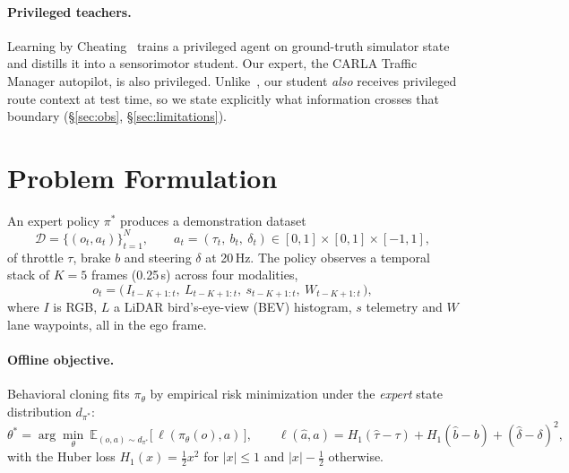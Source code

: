 \documentclass[11pt]{article}
\begin{document}
\paragraph{Privileged teachers.} Learning by Cheating~\cite{chen2019lbc} trains a privileged agent on ground-truth simulator state and distills it into a sensorimotor student. Our expert, the CARLA Traffic Manager autopilot, is also privileged. Unlike~\cite{chen2019lbc}, our student \emph{also} receives privileged route context at test time, so we state explicitly what information crosses that boundary (\S\ref{sec:obs}, \S\ref{sec:limitations}).

\section{Problem Formulation}
\label{sec:problem}

An expert policy $\pi^\ast$ produces a demonstration dataset
\begin{equation}
\mathcal{D} = \{(o_t, a_t)\}_{t=1}^{N}, \qquad a_t = (\tau_t,\ b_t,\ \delta_t) \in [0,1]\times[0,1]\times[-1,1],
\end{equation}
of throttle $\tau$, brake $b$ and steering $\delta$ at 20\,Hz. The policy observes a temporal stack of $K=5$ frames (0.25\,s) across four modalities,
\begin{equation}
o_t = \big(\, I_{t-K+1:t},\ L_{t-K+1:t},\ s_{t-K+1:t},\ W_{t-K+1:t} \,\big),
\end{equation}
where $I$ is RGB, $L$ a LiDAR bird's-eye-view (BEV) histogram, $s$ telemetry and $W$ lane waypoints, all in the ego frame.

\paragraph{Offline objective.} Behavioral cloning fits $\pi_\theta$ by empirical risk minimization under the \emph{expert} state distribution $d_{\pi^\ast}$:
\begin{equation}
\theta^\ast = \arg\min_\theta\ \mathbb{E}_{(o,a)\sim d_{\pi^\ast}} \big[\, \ell(\pi_\theta(o), a)\, \big], \qquad
\ell(\hat a, a) = H_1(\hat\tau-\tau) + H_1(\hat b-b) + (\hat\delta-\delta)^2,
\label{eq:loss}
\end{equation}
with the Huber loss $H_1(x) = \tfrac12 x^2$ for $|x|\le 1$ and $|x|-\tfrac12$ otherwise.
\end{document}
